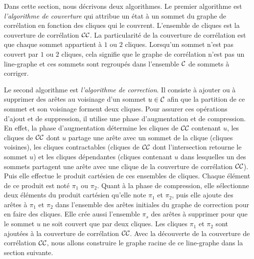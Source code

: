 
Dans cette section, nous d\'ecrivons deux algorithmes. 
Le premier algorithme est {\em l'algorithme de couverture} qui attribue un \'etat \`a un sommet du graphe de corr\'elation en fonction des cliques qui le couvrent. L'ensemble de cliques est la couverture de corr\'elation ${\cal CC}$. La particularit\'e de la couverture de corr\'elation est que chaque sommet appartient \`a $1$ ou $2$ cliques. Lorsqu'un  sommet  n'est pas couvert par $1$ ou $2$ cliques, cela signifie que le graphe de corr\'elation n'est pas un line-graphe et ces sommets sont regroup\'es dans l'ensemble $\cal C$ de sommets \`a corriger.
\newline

Le second algorithme est {\em l'algorithme de correction}. Il consiste \`a ajouter ou \`a supprimer des ar\^etes au voisinage d'un sommet $u \in {\cal C}$ afin que la partition de ce sommet et son voisinage forment deux cliques. Pour assurer ces op\'erations d'ajout et de suppression, il utilise une phase d'augmentation et de compression. 
En effet, la phase d'augmentation d\'etermine les cliques de ${\cal CC}$ contenant $u$, les cliques de ${\cal CC}$  dont $u$ partage une ar\^ete avec un sommet de la clique (cliques voisines), les cliques contractables (cliques de ${\cal CC}$ dont l'intersection retourne le sommet $u$) et les cliques d\'ependantes (cliques contenant $u$ dans lesquelles un des sommets partagent une ar\^ete avec une clique de la couverture de corr\'elation ${\cal CC}$). 
Puis elle effectue le produit cart\'esien de ces ensembles de cliques. Chaque \'el\'ement de ce produit est not\'e $\pi_1$ ou $\pi_2$.
Quant \`a la phase de compression, elle s\'electionne deux \'el\'ements du produit cart\'esien qu'elle note  $\pi_1$ et $\pi_2$, puis elle ajoute des ar\^etes \`a  $\pi_1$ et $\pi_2$ dans l'ensemble des ar\^etes initiales du graphe de correction pour en faire des cliques. Elle cr\'ee aussi l'ensemble $\pi_s$ des ar\^etes \`a supprimer pour que le sommet $u$ ne soit couvert que par deux cliques. 
Les cliques $\pi_1$ et $\pi_2$ sont ajout\'ees \`a la couverture de corr\'elation ${\cal CC}$. 
\newline
Avec la d\'ecouverte de la couverture de corr\'elation ${\cal CC}$, nous allons construire le graphe racine de ce line-graphe dans la section suivante.


